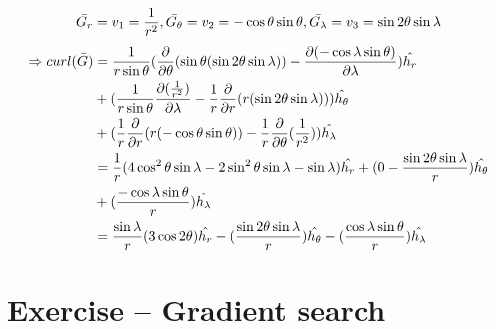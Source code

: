 \documentclass[12pt,a4paper]{article}
\begin{document}
\begin{itemize}
    \[\Bar{G_r} = v_1 = \frac{1}{r^2},\Bar{G_\theta} = v_2 = -\cos{\theta}\sin{\theta},\Bar{G_\lambda} = v_3 = \sin{2\theta}\sin{\lambda}\]
    \begin{equation}
    \begin{aligned}
        \Rightarrow curl(\Bar{G}) &=  \frac{1}{r\sin{\theta}}(\frac{\partial}{\partial\theta}(\sin{\theta}(\sin{2\theta}\sin{\lambda})) - \frac{\partial (-\cos{\lambda}\sin{\theta})}{\partial \lambda})\hat{h_r}\\ &+ (\frac{1}{r\sin{\theta}}\frac{\partial (\frac{1}{r^2})}{\partial\lambda}-\frac{1}{r}\frac{\partial}{\partial r}(r(\sin{2\theta}\sin{\lambda})))\hat{h_\theta}\\&+(\frac{1}{r}\frac{\partial}{\partial r}(r(-\cos{\theta}\sin{\theta}))-\frac{1}{r}\frac{\partial}{\partial\theta}(\frac{1}{r^2}))\hat{h_\lambda}\\
        &= \frac{1}{r}(4\cos^2\theta\sin{\lambda}-2\sin^2\theta\sin{\lambda}-\sin{\lambda})\hat{h_r}+(0 - \frac{\sin{2\theta}\sin{\lambda}}{r})\hat{h_\theta}\\&+(\frac{-\cos{\lambda}\sin{\theta}}{r})\hat{h_\lambda}\\
        &= \frac{\sin{\lambda}}{r}(3\cos{2\theta})\hat{h_r}-(\frac{\sin{2\theta}\sin{\lambda}}{r})\hat{h_\theta}-(\frac{\cos{\lambda}\sin{\theta}}{r})\hat{h_\lambda}\notag
    \end{aligned}
    \end{equation}
\end{itemize}
\section{Exercise – Gradient search}\label{intro}
\end{document}
